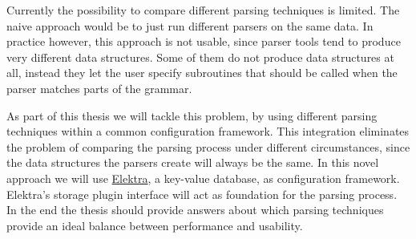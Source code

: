 \documentclass[draft, oneside, final]{vutinfth}
\begin{document}
Currently the possibility to compare different parsing techniques is limited. The naive approach would be to just run different parsers on the same data. In practice however, this approach is not usable, since parser tools tend to produce very different data structures. Some of them do not produce data structures at all, instead they let the user specify subroutines that should be called when the parser matches parts of the grammar.

As part of this thesis we will tackle this problem, by using different parsing techniques within a common configuration framework. This integration eliminates the problem of comparing the parsing process under different circumstances, since the data structures the parsers create will always be the same. In this novel approach we will use \href{http://web.libelektra.org}{Elektra}, a key-value database, as configuration framework. Elektra’s storage plugin interface will act as foundation for the parsing process. In the end the thesis should provide answers about which parsing techniques provide an ideal balance between performance and usability.

\backmatter


\printbibliography
\end{document}
